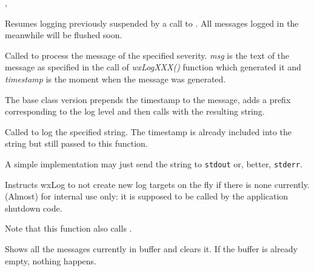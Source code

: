 ,\\

\label{wxlogresume}


Resumes logging previously suspended by a call to
. All messages logged in the meanwhile will be
flushed soon.

\label{wxlogdolog}


Called to process the message of the specified severity. {\it msg} is the text
of the message as specified in the call of {\it wxLogXXX()} function which
generated it and {\it timestamp} is the moment when the message was generated.

The base class version prepends the timestamp to the message, adds a prefix
corresponding to the log level and then calls
 with the resulting string.

\label{wxlogdologstring}


Called to log the specified string. The timestamp is already included into the
string but still passed to this function.

A simple implementation may just send the string to {\tt stdout} or, better,
{\tt stderr}.

\label{wxlogdontcreateondemand}


Instructs wxLog to not create new log targets on the fly if there is none
currently. (Almost) for internal use only: it is supposed to be called by the
application shutdown code.

Note that this function also calls
.

\label{wxlogflush}


Shows all the messages currently in buffer and clears it. If the buffer
is already empty, nothing happens.

